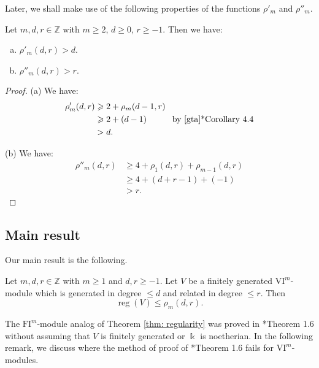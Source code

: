 \documentclass{amsart}
\numberwithin{equation}{section}
\DeclareMathOperator{\reg}{reg}
\newcommand{\Z}{{\mathbb{Z}}}
\newcommand{\VI}{{\mathrm{VI}}}
\newcommand{\FI}{{\mathrm{FI}}}
\begin{document}
Later, we shall make use of the following properties of the functions $\rho'_m$ and $\rho''_m$.

\begin{lemma} \label{lem: rho' and rho'' inequalities}
   Let $m, d, r \in \Z$ with $m\geqslant 2$, $d\geqslant 0$, $r\geqslant -1$. Then we have:
   \begin{enumerate}[(a)]
      \item $\rho'_m(d,r) > d$.
      \item $\rho''_m(d,r) > r$.
   \end{enumerate}
\end{lemma}

\begin{proof}
   (a) We have: 
   \begin{align*}
      \rho'_m(d,r) &\geqslant 2 + \rho_m(d-1, r) \\
      &\geqslant 2 + (d-1) \quad\quad\quad \mbox{by \cite{gta}*{Corollary 4.4}} \\
      &> d.
   \end{align*}

   (b) We have: 
   \begin{align*}
      \rho''_m(d,r) &\geqslant 4+ \rho_1(d,r) + \rho_{m-1}(d,r) \\
      &\geqslant 4+(d+r-1)+(-1) \\
      &> r.
   \end{align*}
\end{proof}



\subsection{Main result}
Our main result is the following. 

\begin{theorem} \label{thm: regularity}
   Let $m, d, r\in \Z$ with $m\geqslant 1$ and $d,r\geqslant -1$. Let $V$ be a finitely generated $\VI^m$-module which is generated in degree $\leqslant d$ and related in degree $\leqslant r$. Then
   \[ \reg(V) \leqslant \rho_m(d,r). \]
\end{theorem}

The $\FI^m$-module analog of Theorem \ref{thm: regularity} was proved in \cite{gta}*{Theorem 1.6} without assuming that $V$ is finitely generated or $\Bbbk$ is noetherian. In the following remark, we discuss where the method of proof of \cite{gta}*{Theorem 1.6} fails for $\VI^m$-modules. 
\end{document}
